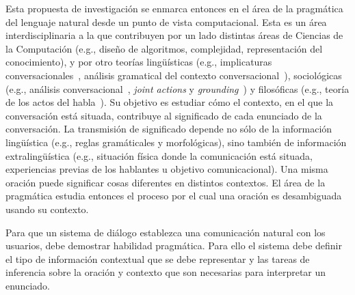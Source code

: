 \documentclass[10.9pt,a4paper]{article}
\begin{document}
Esta propuesta de investigaci\'on se enmarca entonces en el \'area 
de la pragm\'atica del lenguaje natural desde un punto de vista computacional. 
Esta es un \'area interdisciplinaria a la que contribuyen por un lado distintas
\'areas de Ciencias de la Computaci\'on (e.g., dise\~no de algoritmos, 
complejidad, representaci\'on del conocimiento), y por otro teor\'ias 
ling\"u\'isticas (e.g., implicaturas conversacionales~\citep{grice75}, 
an\'alisis gramatical del contexto conversacional~\citep{ginzburg09}), 
sociol\'ogicas (e.g., an\'alisis conversacional~\citep{schegloff87b}, 
\emph{joint actions} y \emph{grounding}~\citep{clark96}) y 
filos\'oficas (e.g., teor\'ia de los actos del habla~\citep{austin62}). Su 
objetivo es estudiar c\'omo el contexto, en el que la conversaci\'on est\'a 
situada, contribuye al significado de cada enunciado de la conversaci\'on.
La transmisi\'on de significado depende no s\'olo de la informaci\'on 
ling\"u\'istica (e.g., reglas gram\'aticales y morfol\'ogicas), sino tambi\'en 
de informaci\'on extraling\"u\'istica (e.g., situaci\'on f\'isica donde la 
comunicaci\'on est\'a situada, experiencias previas de los hablantes u 
objetivo comunicacional).
Una misma oraci\'on puede significar cosas diferentes en
distintos contextos. El \'area de la pragm\'atica estudia entonces el
proceso por el cual una oraci\'on es desambiguada usando su contexto. 

Para que un sistema de di\'alogo establezca una comunicaci\'on natural 
con los usuarios, debe demostrar habilidad pragm\'atica. Para ello el 
sistema debe definir el tipo de informaci\'on contextual que se debe 
representar y las tareas de inferencia sobre la oraci\'on y contexto 
que son necesarias para interpretar un enunciado.
\end{document}
